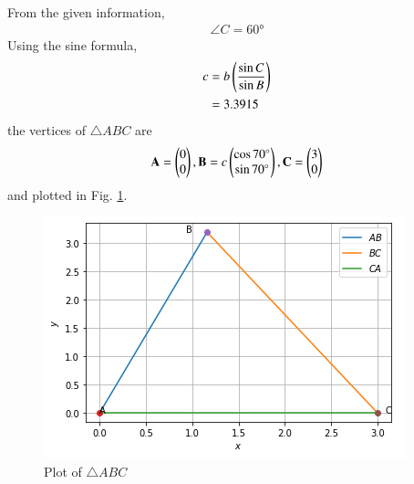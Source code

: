 From the given information,
%
\begin{align}
\angle{C} = \ang{60}
\end{align}
%
Using the sine formula, 
%
\begin{align}
c &= b \left(\frac{\sin{C}}{\sin{B}}\right) 
\\
&= 3.3915
\end{align}
%
the vertices of $\triangle ABC$ are
\begin{align}
\mathbf{A} = \begin{pmatrix}0 \\ 0\end{pmatrix},
\mathbf{B} = c\begin{pmatrix}\cos{\ang{70}} \\ \sin{\ang{70}}\end{pmatrix},
\mathbf{C} = \begin{pmatrix}3 \\ 0\end{pmatrix}
\end{align}
and  plotted in Fig. \ref{constr/tri/27/3/fig:triangle ABC}.
%
\begin{figure}[ht]
    \centering
    \includegraphics[width=\columnwidth]{solutions/triangle/27/3/Triangle_ABC.PNG}
    \caption{Plot of $\triangle ABC$}
    \label{constr/tri/27/3/fig:triangle ABC}
\end{figure}

